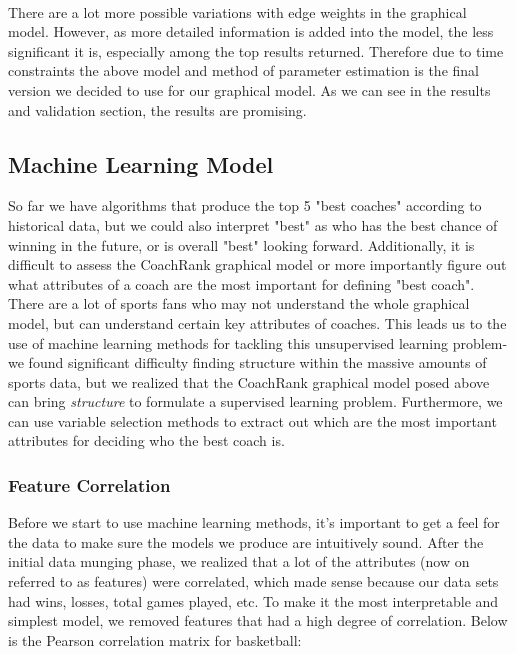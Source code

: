 \documentclass[11pt,notitlepage]{article}
\begin{document}
\noindent 
\\

\noindent There are a lot more possible variations with edge weights in the graphical model. However, as more detailed information is added into the model, the less significant it is, especially among the top results returned. Therefore due to time constraints the above model and method of parameter estimation is the final version we decided to use for our graphical model. As we can see in the results and validation section, the results are promising.

\subsection{Machine Learning Model}

\noindent So far we have algorithms that produce the top 5 "best coaches" according to historical data, but we could also interpret "best" as who has the best chance of winning in the future, or is overall "best" looking forward. Additionally, it is difficult to assess the CoachRank graphical model or more importantly figure out what attributes of a coach are the most important for defining "best coach". There are a lot of sports fans who may not understand the whole graphical model, but can understand certain key attributes of coaches. This leads us to the use of machine learning methods for tackling this unsupervised learning problem- we found significant difficulty finding structure within the massive amounts of sports data, but we realized that the CoachRank graphical model posed above can bring \textit{structure} to formulate a supervised learning problem. Furthermore, we can use variable selection methods to extract out which are the most important attributes for deciding who the best coach is. 

\subsubsection*{Feature Correlation}

\noindent Before we start to use machine learning methods, it's important to get a feel for the data to make sure the models we produce are intuitively sound. After the initial data munging phase, we realized that a lot of the attributes (now on referred to as features) were correlated, which made sense because our data sets had wins, losses, total games played, etc. To make it the most interpretable and simplest model, we removed features that had a high degree of correlation. Below is the Pearson correlation matrix for basketball: 
\end{document}

